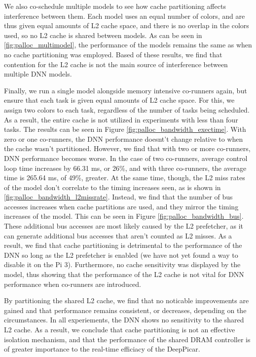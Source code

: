 We also co-schedule multiple models to see how cache partitioning affects
interference between them. Each model uses an equal number of colors, and
are thus given equal amounts of L2 cache space, and there is no overlap
in the colors used, so no L2 cache is shared between models. As can be 
seen in \ref{fig:palloc_multimodel}, the performance of the models 
remains the same as when no cache partitioning was employed. Based of 
these results, we find that contention for the L2 cache is not the main
source of interference between multiple DNN models.

Finally, we run a single model alongside memory intensive co-runners 
again, but ensure that each task is given equal amounts of L2 cache space.
For this, we assign two colors to each task, regardless of the number of
tasks being scheduled. As a result, the entire cache is not utilized in
experiments with less than four tasks. The results can be seen in Figure
\ref{fig:palloc_bandwidth_exectime}. With zero or one co-runners, the DNN
performance doesnt't change relative to when the cache wasn't partitioned.
However, we find that with two or more co-runners, DNN performance becomes
worse. In the case of two co-runners, average control loop time increases
by 66.31 ms, or 26\%, and with three co-runners, the average time
is 265.64 ms, of 49\%, greater.
At the same time, though, the L2 miss rates of the model don't correlate 
to the timing increases seen, as is shown in 
\ref{fig:palloc_bandwidth_l2missrate}. Instead, we find that the number
of bus accesses increases when cache partitions are used, and they mirror
the timing increases of the model. This can be seen in Figure 
\ref{fig:palloc_bandwidth_bus}. These additional bus accesses are
most likely caused by the L2 prefetcher, as it can generate additional bus
accesses that aren't counted as L2 misses. As a result, we find that cache
partitioning is detrimental to the performance of the DNN so long as the 
L2 prefetcher is enabled (we have not yet found a way to disable it on
the Pi 3). Furthermore, no cache sensitivity was displayed by the model,
thus showing that the performance of the L2 cache is not vital for DNN 
performance when co-runners are introduced.

By partitioning the shared L2 cache, we find that no noticable 
improvements are gained and that performance remains consistent, or 
decreases, depending on the circumstances. In all experiements, the DNN
shows no sensitivity to the shared L2 cache. As a result, we conclude 
that cache partitioning is not an effective isolation mechanism, and that 
the performance of the shared DRAM controller is of greater importance 
to the real-time efficiacy of the DeepPicar.

